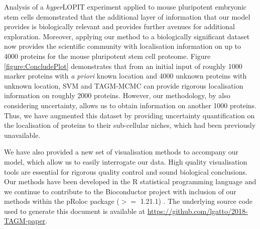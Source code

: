 \documentclass[10pt,letterpaper]{article}\usepackage[]{graphicx}\usepackage[]{color}
\begin{document}
Analysis of a \textit{hyper}LOPIT experiment applied to mouse
pluripotent embryonic stem cells demonstrated that the additional
layer of information that our model provides is biologically relevant
and provides further avenues for additional exploration. Moreover,
applying our method to a biologically significant dataset now provides
the scientific community with localisation information on up to 4000
proteins for the mouse pluripotent stem cell proteome. Figure
\ref{figure:ConcludePlot} demonstrates that from an initial input of
roughly 1000 marker proteins with \textit{a priori} known location and
4000 unknown proteins with unknown location, SVM and TAGM-MCMC can
provide rigorous localisation information on roughly 2000
proteins. However, our methodology, by also considering uncertainty,
allows us to obtain information on another 1000 proteins. Thus, we
have augmented this dataset by providing uncertainty quantification on
the localisation of proteins to their sub-cellular niches, which had
been previously unavailable.
{}



We have also provided a new set of visualisation methods to accompany
our model, which allow us to easily interrogate our data. High quality
visualisation tools are essential for rigorous quality control and
sound biological conclusions.  Our methods have been developed in the
R statistical programming language and we continue to contribute to
the Bioconductor project \cite{Bioconductor::2004, Huber::2015} with
inclusion of our methods within the pRoloc package ($>=$ 1.21.1)
\cite{pRoloc:2014}. The underlying source code used to generate this
document is available at
\url{https://github.com/lgatto/2018-TAGM-paper}.

\bigskip

\end{document}
